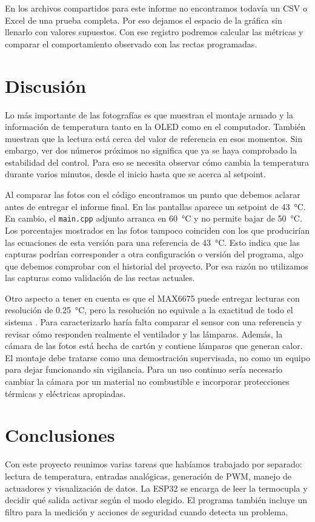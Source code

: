 \documentclass[11pt,letterpaper]{article}
\begin{document}
En los archivos compartidos para este informe no encontramos todavía un CSV o Excel de una prueba completa. Por eso dejamos el espacio de la gráfica sin llenarlo con valores supuestos. Con ese registro podremos calcular las métricas y comparar el comportamiento observado con las rectas programadas.

\section{Discusión}
Lo más importante de las fotografías es que muestran el montaje armado y la información de temperatura tanto en la OLED como en el computador. También muestran que la lectura está cerca del valor de referencia en esos momentos. Sin embargo, ver dos números próximos no significa que ya se haya comprobado la estabilidad del control. Para eso se necesita observar cómo cambia la temperatura durante varios minutos, desde el inicio hasta que se acerca al setpoint.

Al comparar las fotos con el código encontramos un punto que debemos aclarar antes de entregar el informe final. En las pantallas aparece un setpoint de \SI{43}{\celsius}. En cambio, el \texttt{main.cpp} adjunto arranca en \SI{60}{\celsius} y no permite bajar de \SI{50}{\celsius}. Los porcentajes mostrados en las fotos tampoco coinciden con los que producirían las ecuaciones de esta versión para una referencia de \SI{43}{\celsius}. Esto indica que las capturas podrían corresponder a otra configuración o versión del programa, algo que debemos comprobar con el historial del proyecto. Por esa razón no utilizamos las capturas como validación de las rectas actuales.

Otro aspecto a tener en cuenta es que el MAX6675 puede entregar lecturas con resolución de \SI{0.25}{\celsius}, pero la resolución no equivale a la exactitud de todo el sistema \parencite{analog2021}. Para caracterizarlo haría falta comparar el sensor con una referencia y revisar cómo responden realmente el ventilador y las lámparas. Además, la cámara de las fotos está hecha de cartón y contiene lámparas que generan calor. El montaje debe tratarse como una demostración supervisada, no como un equipo para dejar funcionando sin vigilancia. Para un uso continuo sería necesario cambiar la cámara por un material no combustible e incorporar protecciones térmicas y eléctricas apropiadas.

\section{Conclusiones}
Con este proyecto reunimos varias tareas que habíamos trabajado por separado: lectura de temperatura, entradas analógicas, generación de PWM, manejo de actuadores y visualización de datos. La ESP32 se encarga de leer la termocupla y decidir qué salida activar según el modo elegido. El programa también incluye un filtro para la medición y acciones de seguridad cuando detecta un problema.
\end{document}
